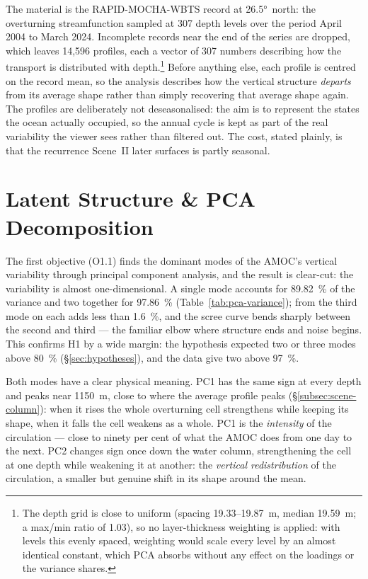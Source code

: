 The material is the RAPID-MOCHA-WBTS record at \ang{26.5}~north: the overturning streamfunction sampled at 307 depth levels over the period April 2004 to March 2024. Incomplete records near the end of the series are dropped, which leaves 14{,}596 profiles, each a vector of 307 numbers describing how the transport is distributed with depth.\footnote{The depth grid is close to uniform (spacing 19.33--19.87~m, median 19.59~m; a max/min ratio of 1.03), so no layer-thickness weighting is applied: with levels this evenly spaced, weighting would scale every level by an almost identical constant, which PCA absorbs without any effect on the loadings or the variance shares.} Before anything else, each profile is centred on the record mean, so the analysis describes how the vertical structure \emph{departs} from its average shape rather than simply recovering that average shape again. The profiles are deliberately not deseasonalised: the aim is to represent the states the ocean actually occupied, so the annual cycle is kept as part of the real variability the viewer sees rather than filtered out. The cost, stated plainly, is that the recurrence Scene~II later surfaces is partly seasonal.

\section{Latent Structure \& PCA Decomposition}
\label{sec:detect-pca}
 
The first objective (O1.1) finds the dominant modes of the AMOC's vertical variability through principal component analysis, and the result is clear-cut: the variability is almost one-dimensional. A single mode accounts for \SI{89.82}{\percent} of the variance and two together for \SI{97.86}{\percent} (Table~\ref{tab:pca-variance}); from the third mode on each adds less than \SI{1.6}{\percent}, and the scree curve bends sharply between the second and third --- the familiar elbow where structure ends and noise begins. This confirms H1 by a wide margin: the hypothesis expected two or three modes above \SI{80}{\percent} (\S\ref{sec:hypotheses}), and the data give two above \SI{97}{\percent}.
 


 
Both modes have a clear physical meaning. PC1 has the same sign at every depth and peaks near 1150~m, close to where the average profile peaks (\S\ref{subsec:scene-column}): when it rises the whole overturning cell strengthens while keeping its shape, when it falls the cell weakens as a whole. PC1 is the \emph{intensity} of the circulation --- close to ninety per cent of what the AMOC does from one day to the next. PC2 changes sign once down the water column, strengthening the cell at one depth while weakening it at another: the \emph{vertical redistribution} of the circulation, a smaller but genuine shift in its shape around the mean.

